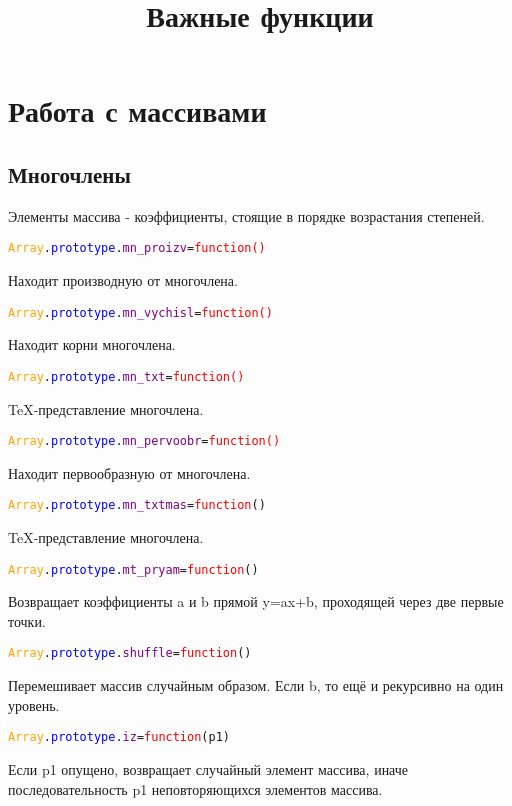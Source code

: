\documentclass[a4paper,12pt]{article}
\begin{document}
	
	\title{Важные функции}
	\section{Работа с массивами}
	\subsection{Многочлены}
	Элементы массива - коэффициенты, стоящие в порядке возрастания степеней.
	\begin{alltt}
		\textcolor{Orange}{Array}.\textcolor{Blue}{prototype}.\textcolor{Purple}{mn_proizv}=\textcolor{Red}{function()}
	\end{alltt}
	Находит производную от многочлена. 
	\begin{alltt}
		\textcolor{Orange}{Array}.\textcolor{Blue}{prototype}.\textcolor{Purple}{mn_vychisl}=\textcolor{Red}{function()}
	\end{alltt}
	Находит корни многочлена.
	\begin{alltt}
		\textcolor{Orange}{Array}.\textcolor{Blue}{prototype}.\textcolor{Purple}{mn_txt}=\textcolor{Red}{function()}
	\end{alltt}
	TeX-представление многочлена.%
	\begin{alltt}
		\textcolor{Orange}{Array}.\textcolor{Blue}{prototype}.\textcolor{Purple}{mn_pervoobr}=\textcolor{Red}{function()}
	\end{alltt}
	Находит первообразную от многочлена.%
	\begin{alltt}
		\textcolor{Orange}{Array}.\textcolor{Blue}{prototype}.\textcolor{Purple}{mn_txtmas}=\textcolor{Red}{function}()
	\end{alltt}
	TeX-представление многочлена.
	\begin{alltt}
		\textcolor{Orange}{Array}.\textcolor{Blue}{prototype}.\textcolor{Purple}{mt_pryam}=\textcolor{Red}{function}()
	\end{alltt}
	Возвращает коэффициенты a и b прямой y=ax+b, проходящей через две первые точки.
	\begin{alltt}
		\textcolor{Orange}{Array}.\textcolor{Blue}{prototype}.\textcolor{Purple}{shuffle}=\textcolor{Red}{function}()
	\end{alltt}	
	Перемешивает массив случайным образом. Если b, то ещё и рекурсивно на один уровень.
	\begin{alltt}
		\textcolor{Orange}{Array}.\textcolor{Blue}{prototype}.\textcolor{Purple}{iz}=\textcolor{Red}{function}(p1)
	\end{alltt}
	Если p1 опущено, возвращает случайный элемент массива, иначе последовательность p1 неповторяющихся элементов массива.
\end{document}
